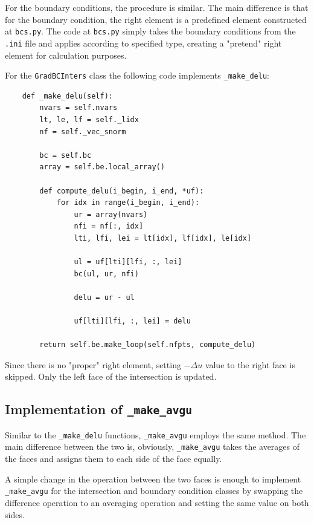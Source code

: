 \documentclass[a4paper, 12pt]{article}
\begin{document}
For the boundary conditions, the procedure is similar. The main difference is that for the boundary condition, the right element is a predefined element constructed at \verb|bcs.py|. The code at \verb|bcs.py| simply takes the boundary conditions from the \verb|.ini| file and applies according to specified type, creating a "pretend" right element for calculation purposes.\newpage \par

For the \verb|GradBCInters| class the following code implements \verb|_make_delu|:

\begin{verbatim}
    def _make_delu(self):
        nvars = self.nvars
        lt, le, lf = self._lidx
        nf = self._vec_snorm

        bc = self.bc
        array = self.be.local_array()

        def compute_delu(i_begin, i_end, *uf):
            for idx in range(i_begin, i_end):
                ur = array(nvars)
                nfi = nf[:, idx]
                lti, lfi, lei = lt[idx], lf[idx], le[idx]

                ul = uf[lti][lfi, :, lei]
                bc(ul, ur, nfi)

                delu = ur - ul

                uf[lti][lfi, :, lei] = delu

        return self.be.make_loop(self.nfpts, compute_delu)
\end{verbatim}
\par

Since there is no "proper" right element, setting $-\Delta u$ value to the right face is skipped. Only the left face of the intersection is updated.

\subsection{Implementation of \texttt{\_make\_avgu}} 

Similar to the \verb|_make_delu| functions, \verb|_make_avgu| employs the same method. The main difference between the two is, obviously, \verb|_make_avgu| takes the averages of the faces and assigns them to each side of the face equally. \\\par

A simple change in the operation between the two faces is enough to implement \verb|_make_avgu| for the intersection and boundary condition classes by swapping the difference operation to an averaging operation and setting the same value on both sides. \newpage \par
\end{document}
